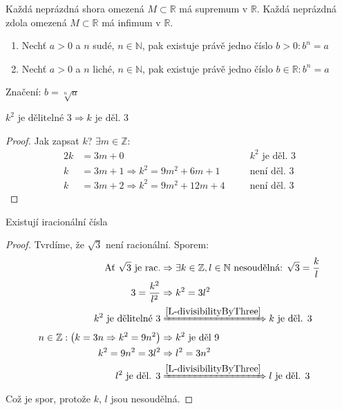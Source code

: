 \begin{definitionAi}[name=Supremum a infimum, label=D-A3]
	Každá neprázdná shora omezená $M\subset\mathbb{R}$ má supremum v $\mathbb{R}$.
	Každá neprázdná zdola omezená $M\subset\mathbb{R}$ má infimum v $\mathbb{R}$.
\end{definitionAi}

\begin{definition}[name=Odmocnina, label=D-sqrt]\noindent
	\begin{enumerate}
		\item Nechť $a>0$ a $n$ sudé, $n\in\mathbb{N}$, pak existuje právě jedno číslo $b>0: b^n=a$
		\item Nechť $a>0$ a $n$ liché, $n\in\mathbb{N}$, pak existuje právě jedno číslo $b\in\mathbb{R}: b^n=a$
	\end{enumerate}
	Značení: $b=\sqrt[n]{a}$
\end{definition}

\begin{lemmaAlph}[name=Čtverec dělitelný třema, label=L-divisibilityByThree]
	$k^2 \text{ je dělitelné }3\Rightarrow k \text{ je děl. }3$
\end{lemmaAlph}
\begin{proof}
	Jak zapsat $k$? $\exists m\in\mathbb{Z}:$
	\begin{alignat}{2}
		k &= 3m+0 &&k^2\text{ je děl. $3$}\\
		k &= 3m+1 \Rightarrow k^2=9m^2+6m+1 \quad&&\text{není děl. $3$} \\
		k &= 3m+2 \Rightarrow k^2=9m^2+12m+4 \quad&&\text{není děl. $3$}
	\end{alignat}
\end{proof}

\begin{theorem}
	Existují iracionální čísla
\end{theorem}
\begin{proof}
	Tvrdíme, že $\sqrt{3}$ není racionální. Sporem:
	\begin{alignat}{1}
		\text{Ať $\sqrt{3}$ je rac.} &\Rightarrow\exists k\in\mathbb{Z}, l\in\mathbb{N}
			\text{ nesoudělná: }\sqrt{3}=\frac{k}{l} \\
		3=\frac{k^2}{l^2} &\Rightarrow k^2=3l^2 \\
		k^2 \text{ je dělitelné }3 &\xRightarrow{\autoref{L-divisibilityByThree}} k\text{ je děl. }3 \\
		n\in\mathbb{Z}: \left(k=3n\Rightarrow k^2=9n^2\right) &\Rightarrow k^2 \text{ je děl }9 \\
		k^2=9n^2=3l^2 &\Rightarrow l^2=3n^2 \\
		l^2 \text{ je děl. }3 &\xRightarrow{\autoref{L-divisibilityByThree}} l\text{ je děl. }3
	\end{alignat}
	Což je spor, protože $k$, $l$ jsou nesoudělná.
\end{proof}

